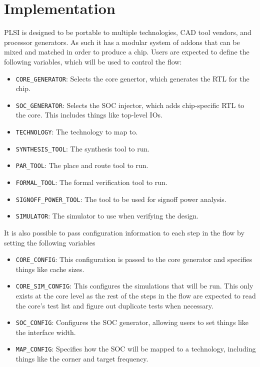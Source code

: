 \documentclass{article}
\begin{document}
\chapter{Implementation}

PLSI is designed to be portable to multiple technologies, CAD tool vendors, and
processor generators.  As such it has a modular system of addons that can be
mixed and matched in order to produce a chip.  Users are expected to define the
following variables, which will be used to control the flow:

\begin{itemize}
\item \texttt{CORE\_GENERATOR}: Selects the core genertor, which generates the
RTL for the chip.
\item \texttt{SOC\_GENERATOR}: Selects the SOC injector, which adds
chip-specific RTL to the core.  This includes things like top-level IOs.
\item \texttt{TECHNOLOGY}: The technology to map to.
\item \texttt{SYNTHESIS\_TOOL}: The synthesis tool to run.
\item \texttt{PAR\_TOOL}: The place and route tool to run.
\item \texttt{FORMAL\_TOOL}: The formal verification tool to run.
\item \texttt{SIGNOFF\_POWER\_TOOL}: The tool to be used for signoff power analysis.
\item \texttt{SIMULATOR}: The simulator to use when verifying the design.
\end{itemize}

It is also possible to pass configuration information to each step in the flow
by setting the following variables

\begin{itemize}
\item \texttt{CORE\_CONFIG}: This configuration is passed to the core generator
and specifies things like cache sizes.
\item \texttt{CORE\_SIM\_CONFIG}: This configures the simulations that will be
run.  This only exists at the core level as the rest of the steps in the flow
are expected to read the core's test list and figure out duplicate tests when
necessary.
\item \texttt{SOC\_CONFIG}: Configures the SOC generator, allowing users to set
things like the interface width.
\item \texttt{MAP\_CONFIG}: Specifies how the SOC will be mapped to a
technology, including things like the corner and target frequency.
\end{itemize}
\end{document}
